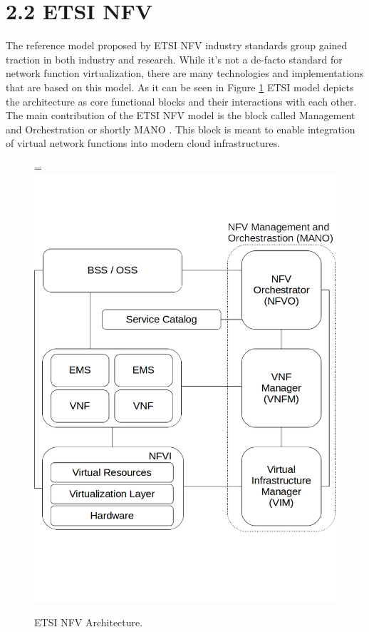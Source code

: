 \documentclass[12pt,oneandhalf,chaparabic,ceng,ms,eng,oneside,pntc]{gsufbe}
\makeatletter
\let\old@includegraphics\includegraphics
\renewcommand{\includegraphics}[2][,]{%
  \setbox9=\hbox{\old@includegraphics[#1]{#2}}%
  \ifdim\wd9>\textwidth
    \old@includegraphics[#1,width=\textwidth]{#2}%
  \else
    \old@includegraphics[#1]{#2}%
  \fi%
}
\makeatother
\begin{document}
\section[ETSI NFV]{2.2 ETSI NFV}
The reference model \cite{etsi_nfv} proposed by ETSI NFV industry standards group gained traction
in both industry and
research.  While it's not a de-facto standard for network function virtualization, there are many
technologies and implementations that are based on this model.  As it can be seen in Figure \ref{fig:mano}
ETSI model depicts the architecture as core functional blocks and their interactions with each other.  
The main contribution of the ETSI NFV model is the block called Management and Orchestration or shortly
MANO \cite{etsi_nfvman}.  This block is meant to enable integration of virtual network functions 
into modern cloud
infrastructures.

\begin{figure}
\centering
\includegraphics[]{mano.png}
\caption{ETSI NFV Architecture.}
\label{fig:mano}
\end{figure}
\end{document}
